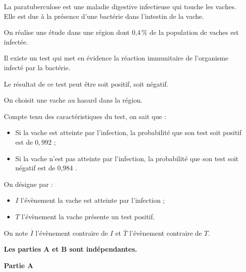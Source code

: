 \medskip

La paratuberculose est une maladie digestive infectieuse qui touche les vaches. Elle est due à la présence d'une bactérie dans l'intestin de la vache.

On réalise une étude dans une région dont 0,4\,\% de la population de vaches est infectée.

Il existe un test qui met en évidence la réaction immunitaire de l'organisme infecté par la bactérie.

Le résultat de ce test peut être soit \og positif\fg{}, soit \og négatif\fg{}.

On choisit une vache au hasard dans la région.

Compte tenu des caractéristiques du test, on sait que :

\begin{itemize}
\item Si la vache est atteinte par l'infection, la probabilité que son test soit positif est de $0,992$ ;
\item Si la vache n'est pas atteinte par l'infection, la probabilité que son test soit négatif est de 0,984 .
\end{itemize}

On désigne par :
	\begin{itemize}
		\item $I$ l'évènement \og{}la vache est atteinte par l'infection\fg{} ;
		\item $T$ l'évènement \og{}la vache présente un test positif\fg{}.
	\end{itemize}

On note $\overline{I}$ l'évènement contraire de $I$ et $\overline{T}$ l'évènement contraire de $T$.

\medskip

\textbf{Les parties A et B sont indépendantes.}

\bigskip

\textbf{Partie A}
\smallskip

